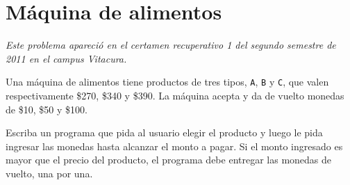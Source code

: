 \section{Máquina de alimentos}

\emph{Este problema apareció en el certamen recuperativo 1 del segundo
semestre de 2011 en el campus Vitacura.}

Una máquina de alimentos tiene productos de tres tipos, \lstinline!A!,
\lstinline!B! y \lstinline!C!, que valen respectivamente \$270, \$340 y
\$390. La máquina acepta y da de vuelto monedas de \$10, \$50 y \$100.

Escriba un programa que pida al usuario elegir el producto y luego le
pida ingresar las monedas hasta alcanzar el monto a pagar. Si el monto
ingresado es mayor que el precio del producto, el programa debe entregar
las monedas de vuelto, una por una.
